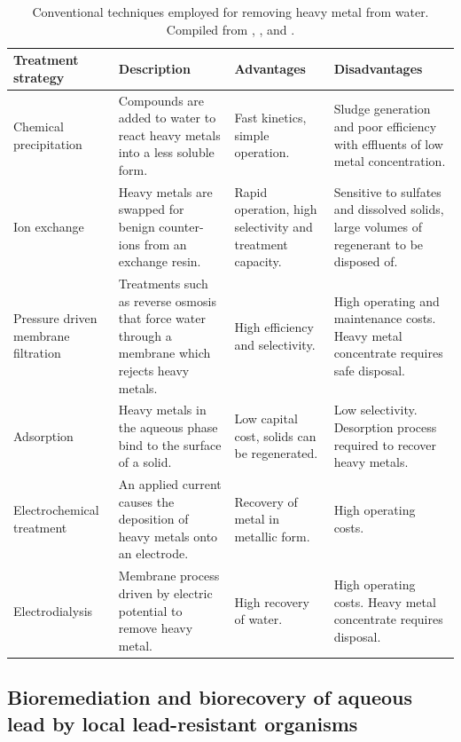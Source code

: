 \begin{small}
\setlength{\extrarowheight}{0.2cm}
\begin{longtable}{>{\raggedright\arraybackslash}p{2.5cm}>{\raggedright\arraybackslash}p{3cm}>{\raggedright\arraybackslash}p{3cm}>{\raggedright\arraybackslash}p{3cm}}
	\caption{Conventional techniques employed for removing heavy metal from water. Compiled from \textcite{Fu2011a}, \textcite{VanHille}, and \textcite{Edzwald2011}.}
	\label{tab:conventional}\\
	\toprule
	Treatment strategy & Description & Advantages & Disadvantages \\ 
	\midrule
	\endhead
	\bottomrule
	\endfoot
	Chemical precipitation & Compounds are added to water to react heavy metals into a less soluble form. & Fast kinetics, simple operation. & Sludge generation and poor efficiency with effluents of low metal concentration. \\ 
	Ion exchange & Heavy metals are swapped for benign counter-ions from an exchange resin. & Rapid operation, high selectivity and treatment capacity. & Sensitive to sulfates and dissolved solids, large volumes of regenerant to be disposed of. \\ 
	Pressure driven membrane filtration & Treatments such as reverse osmosis that force water through a membrane which rejects heavy metals. & High efficiency and selectivity. & High operating and maintenance costs. Heavy metal concentrate requires safe disposal. \\ 
	Adsorption & Heavy metals in the aqueous phase bind to the surface of a solid. & Low capital cost, solids can be regenerated. & Low selectivity. Desorption process required to recover heavy metals. \\ 
	Electrochemical treatment & An applied current causes the deposition of heavy metals onto an electrode. & Recovery of metal in metallic form. & High operating costs. \\ 
	Electrodialysis & Membrane process driven by electric potential to remove heavy metal. & High recovery of water. & High operating costs. Heavy metal concentrate requires disposal. \\ 
\end{longtable}
\end{small}

\subsection{Bioremediation and biorecovery of aqueous lead by local lead-resistant organisms}

